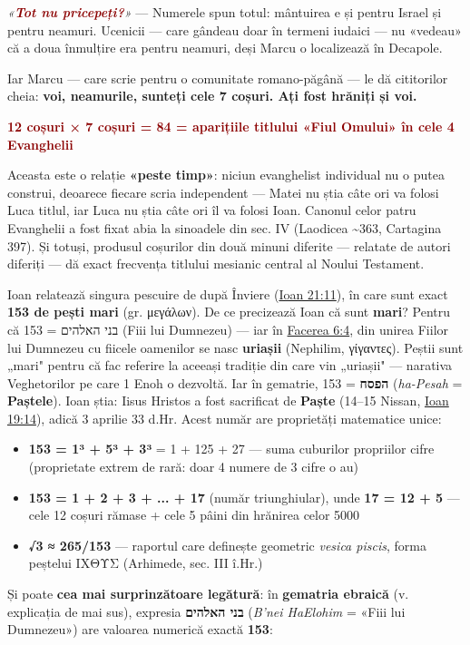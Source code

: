 \documentclass[12pt,a4paper,twoside,openany]{book}
\begin{document}
\textit{«\textcolor{darkred}{\textbf{Tot nu pricepeți?}}»} — Numerele spun totul: mântuirea e și pentru Israel și pentru neamuri. Ucenicii — care gândeau doar în termeni iudaici — nu «vedeau» că a doua înmulțire era pentru neamuri, deși Marcu o localizează în Decapole.

Iar Marcu — care scrie pentru o comunitate romano-păgână — le dă cititorilor cheia: \textbf{voi, neamurile, sunteți cele 7 coșuri. Ați fost hrăniți și voi.}

\textcolor{darkred}{\textbf{12 coșuri × 7 coșuri = 84 = aparițiile titlului «Fiul Omului» în cele 4 Evanghelii}}

Aceasta este o relație \textbf{«peste timp»}: niciun evanghelist individual nu o putea construi, deoarece fiecare scria independent — Matei nu știa câte ori va folosi Luca titlul, iar Luca nu știa câte ori îl va folosi Ioan. Canonul celor patru Evanghelii a fost fixat abia la sinoadele din sec. IV (Laodicea \textasciitilde{}363, Cartagina 397). Și totuși, produsul coșurilor din două minuni diferite — relatate de autori diferiți — dă exact frecvența titlului mesianic central al Noului Testament.

Ioan relatează singura pescuire de după Înviere (\href{https://bibliaortodoxa.ro/carte.php?id=35\&cap=21\#11}{Ioan 21:11}), în care sunt exact \textbf{153 de pești mari} (gr. μεγάλων). De ce precizează Ioan că sunt \textbf{mari}? Pentru că 153 = בני האלהים (Fiii lui Dumnezeu) — iar în \href{https://bibliaortodoxa.ro/carte.php?id=25\&cap=6\#4}{Facerea 6:4}, din unirea Fiilor lui Dumnezeu cu fiicele oamenilor se nasc \textbf{uriașii} (Nephilim, γίγαντες). Peștii sunt „mari" pentru că fac referire la aceeași tradiție din care vin „uriașii" — narativa Veghetorilor pe care 1 Enoh o dezvoltă. Iar în gematrie, 153 = \textbf{הפסח} (\textit{ha-Pesah} = \textbf{Paștele}). Ioan știa: Iisus Hristos a fost sacrificat de \textbf{Paște} (14–15 Nissan, \href{https://bibliaortodoxa.ro/carte.php?id=35\&cap=19\#14}{Ioan 19:14}), adică 3 aprilie 33 d.Hr. Acest număr are proprietăți matematice unice:

\begin{itemize}
  \item \textbf{153 = 1³ + 5³ + 3³} = 1 + 125 + 27 — suma cuburilor propriilor cifre (proprietate extrem de rară: doar 4 numere de 3 cifre o au)
  \item \textbf{153 = 1 + 2 + 3 + ... + 17} (număr triunghiular), unde \textbf{17 = 12 + 5} — cele 12 coșuri rămase + cele 5 pâini din hrănirea celor 5000
  \item \textbf{√3 ≈ 265/153} — raportul care definește geometric \textit{vesica piscis}, forma peștelui ΙΧΘΥΣ (Arhimede, sec. III î.Hr.)
\end{itemize}
Și poate \textbf{cea mai surprinzătoare legătură}: în \textbf{gematria ebraică} (v. explicația de mai sus), expresia \textbf{בני האלהים} (\textit{B'nei HaElohim} = «Fiii lui Dumnezeu») are valoarea numerică exactă \textbf{153}:
\end{document}
